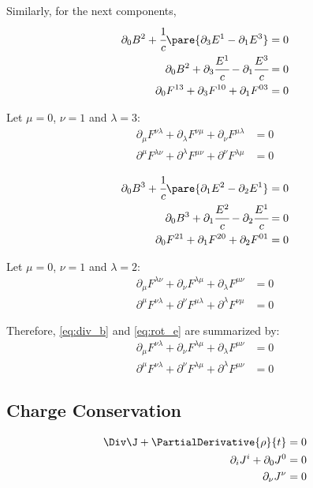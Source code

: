   Similarly, for the next components,
  \begin{align}
    \partial_0B^2 + \cfrac{1}{c}\pare{\partial_3E^1 - \partial_1E^3} &= 0\\
    \partial_0B^2 + \partial_3\cfrac{E^1}{c} - \partial_1\cfrac{E^3}{c} &= 0\\
    \partial_0F^{13} + \partial_3F^{10} + \partial_1F^{03} &= 0
  \end{align}

  Let $\mu = 0$, $\nu = 1$ and $\lambda=3$:
  \begin{align}
  \partial_\mu F^{\nu\lambda} + \partial_\lambda F^{\nu\mu} + \partial_\nu F^{\mu\lambda} &= 0 \\
  \partial^\mu F^{\lambda\nu} + \partial^\lambda F^{\mu\nu} + \partial^\nu F^{\lambda\mu} &= 0
  \end{align}

  \begin{align}
    \partial_0B^3 + \cfrac{1}{c}\pare{\partial_1E^2 - \partial_2E^1} &= 0\\
    \partial_0B^3 + \partial_1\cfrac{E^2}{c} - \partial_2\cfrac{E^1}{c} &= 0\\
    \partial_0F^{21} + \partial_1F^{20} + \partial_2F^{01} &= 0
  \end{align}

  Let $\mu = 0$, $\nu = 1$ and $\lambda=2$:
  \begin{align}
  \partial_\mu F^{\lambda\nu} + \partial_\nu F^{\lambda\mu} + \partial_\lambda F^{\mu\nu} &= 0 \\
  \partial^\mu F^{\nu\lambda} + \partial^\nu F^{\mu\lambda} + \partial^\lambda F^{\nu\mu} &= 0
  \end{align}

  Therefore, \autoref{eq:div_b} and \autoref{eq:rot_e} are summarized by:
  \begin{align}
    \partial_\mu F^{\nu\lambda} + \partial_\nu F^{\lambda\mu} + \partial_\lambda F^{\mu\nu} &= 0\\
    \partial^\mu F^{\nu\lambda} + \partial^\nu F^{\lambda\mu} + \partial^\lambda F^{\mu\nu} &= 0
  \end{align}

\subsection{Charge Conservation}
  \begin{align}
    \Div \J + \PartialDerivative{\rho}{t} &= 0 \\
    \partial_i J^i + \partial_0 J^0 &=0 \\
    \partial_\nu J^\nu &= 0
  \end{align}

